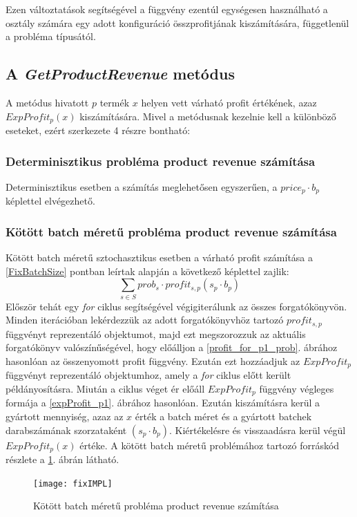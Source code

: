 Ezen változtatások segítségével a  függvény ezentúl egységesen használható a  osztály számára egy adott konfiguráció összprofitjának kiszámítására, függetlenül a probléma típusától. 
\subsection{A \textit{GetProductRevenue} metódus} \label{getProductRevenue}
A  metódus hivatott $p$ termék $x$ helyen vett várható profit értékének, azaz $ExpProfit_p(x)$ kiszámítására.
Mivel a metódusnak kezelnie kell a különböző eseteket, ezért szerkezete 4 részre bontható:
\subsubsection{Determinisztikus probléma product revenue számítása}
Determinisztikus esetben a számítás meglehetősen egyszerűen, a $price_p \cdot b_p$ képlettel elvégezhető.
\subsubsection{Kötött batch méretű probléma product revenue számítása}
Kötött batch méretű sztochasztikus esetben a várható profit számítása a \ref{FixBatchSize} pontban leírtak alapján a következő képlettel zajlik: $$\sum_{s \in S} prob_s \cdot profit_{s,p} (s_p \cdot b_p)$$
Először tehát egy \textit{for} ciklus segítségével végigiterálunk az összes forgatókönyvön.
Minden iterációban lekérdezzük az adott forgatókönyvhöz tartozó $profit_{s,p}$ függvényt reprezentáló  objektumot, majd ezt megszorozzuk az aktuális forgatókönyv valószínűségével, hogy előálljon a \ref{profit_for_p1_prob}. ábrához hasonlóan az összenyomott profit függvény.
Ezután ezt hozzáadjuk az $ExpProfit_p$ függvényt reprezentáló  objektumhoz, amely a \textit{for} ciklus előtt került példányosításra.
Miután a ciklus véget ér előáll  $ExpProfit_p$ függvény végleges formája a \ref{expProfit_p1}. ábrához hasonlóan.
Ezután kiszámításra kerül a gyártott mennyiség, azaz az $x$ érték a batch méret és a gyártott batchek darabszámának szorzataként $(s_p \cdot b_p)$.
Kiértékelésre és visszaadásra kerül végül $ExpProfit_p(x)$ értéke.
A kötött batch méretű problémához tartozó forráskód részlete a \ref{fixIMPL}. ábrán látható.
\begin{figure}
\begin{center}
\texttt{[image: fixIMPL]}
\caption{Kötött batch méretű probléma product revenue számítása}
\label{fixIMPL}
\end{center}
\end{figure} 
